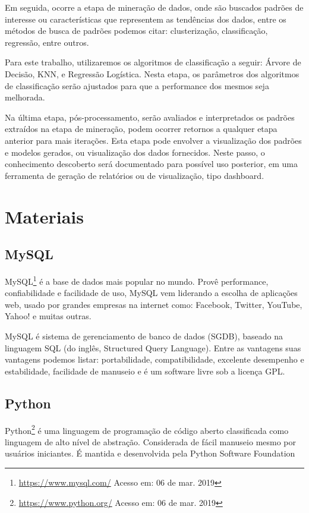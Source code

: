 Em seguida, ocorre a etapa de mineração de dados, onde são buscados padrões de
interesse ou características que representem as tendências dos dados, entre os
métodos de busca de padrões podemos citar: clusterização, classificação,
regressão, entre outros.

Para este trabalho, utilizaremos os algoritmos de classificação a seguir: Árvore
de Decisão, KNN, e Regressão Logística. Nesta etapa, os parâmetros dos
algoritmos de classificação serão ajustados para que a performance dos mesmos
seja melhorada.

Na última etapa, pós-processamento, serão avaliados e interpretados os padrões
extraídos na etapa de mineração, podem ocorrer retornos a qualquer etapa
anterior para mais iterações. Esta etapa pode envolver a visualização dos
padrões e modelos gerados, ou visualização dos dados fornecidos. Neste passo, o
conhecimento descoberto será documentado para possível uso posterior, em uma
ferramenta de geração de relatórios ou de visualização, tipo dashboard.

\section{Materiais}

\subsection{MySQL}

MySQL\footnote{\url{https://www.mysql.com/} Acesso em: 06 de mar. 2019} é a base
de dados mais popular no mundo. Provê performance, confiabilidade e facilidade
de uso, MySQL vem liderando a escolha de aplicações web, usado por grandes
empresas na internet como: Facebook, Twitter, YouTube, Yahoo! e muitas outras.

MySQL é sistema de gerenciamento de banco de dados (SGDB), baseado na linguagem
SQL (do inglês, Structured Query Language). Entre as vantagens suas vantagens
podemos listar: portabilidade, compatibilidade, excelente desempenho e
estabilidade, facilidade de manuseio e é um software livre sob a licença GPL.

\subsection{Python}

Python\footnote{\url{https://www.python.org/} Acesso em: 06 de mar. 2019} é uma
linguagem de programação de código aberto classificada como linguagem de alto
nível de abstração. Considerada de fácil manuseio mesmo por usuários iniciantes.
É mantida e desenvolvida pela Python Software Foundation

